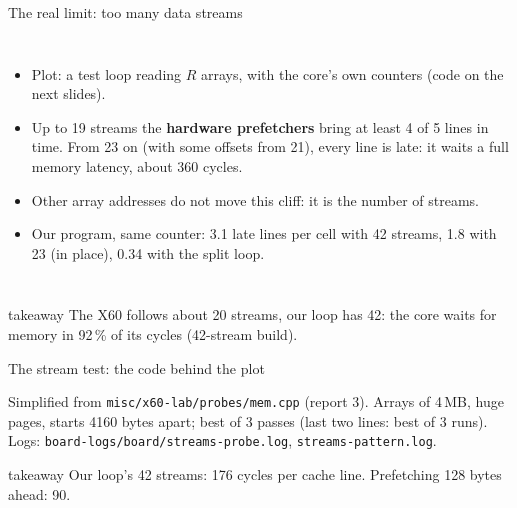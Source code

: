 \documentclass[aspectratio=169,10pt,t]{beamer}
\newcommand{\term}[1]{\textcolor{psblue!85!black}{\textbf{#1}}} %
\newcommand{\code}[1]{\texttt{#1}}
\newcommand{\takeaway}[1]{\par\vfill
  \begin{beamercolorbox}[wd=\textwidth,sep=4pt,rounded=true]{takeaway}
    \small #1
  \end{beamercolorbox}}
\begin{document}
\begin{frame}{The real limit: too many data streams}
  \begin{columns}[T,onlytextwidth]
    \centering
    \vspace{1mm}
    \begin{itemize}\small
      \item Plot: a test loop reading $R$ arrays, with the core's own counters (code on the next slides).
      \item Up to 19 streams the \term{hardware prefetchers} bring at least 4 of 5 lines in time. From 23
            on (with some offsets from 21), every line is late: it waits a full memory latency, about 360 cycles.
      \item Other array addresses do not move this cliff: it is the number of streams.
      \item Our program, same counter: 3.1 late lines per cell with 42 streams, 1.8 with 23 (in place),
            0.34 with the split loop.
    \end{itemize}
  \end{columns}
  \takeaway{The X60 follows about 20 streams, our loop has 42: the core waits for memory in 92\,\% of
    its cycles (42-stream build).}
\end{frame}

\begin{frame}{The stream test: the code behind the plot}
  \vspace{2mm}
  \centering

  \vspace{2mm}
  {\scriptsize\color{psgray}Simplified from \code{misc/x60-lab/probes/mem.cpp} (report 3). Arrays of 4\,MB,
  huge pages, starts 4160 bytes apart; best of 3 passes (last two lines: best of 3 runs). Logs:
  \code{board-logs/board/streams-probe.log}, \code{streams-pattern.log}.\par}
  \takeaway{Our loop's 42 streams: 176 cycles per cache line. Prefetching 128 bytes ahead: 90.}
\end{frame}
\end{document}
